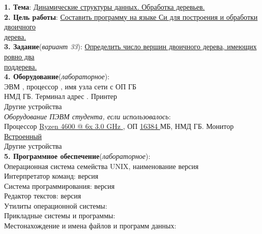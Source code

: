 \documentclass[10pt]{report}
\begin{document}
    \begin{spacing}{1}
        \indent \textbf{1. Тема}: \underline{Динамические структуры данных. Обработка деревьев.}\\               %
        \indent \textbf{2. Цель работы}: \underline{Составить программу на языке Си для построения и обработки двоичного} \\
        \indent \underline{дерева.} \\   %
        \indent \textbf{3. Задание}(\textit{вариант 33}): \underline{Определить число вершин двоичного дерева, имеющих ровно два}\\
        \indent \underline{поддерева.}\\%
        \indent \textbf{4. Оборудование}(\textit{лабораторное}):  \\ 
        \indent ЭВМ \tlinee{0.5in}, процессор \tlinee{0.7in}, имя узла сети \tlinee{0.3in} с ОП \tlinee{0.2in} ГБ\\
        \indent НМД \tlinee{0.5in} ГБ. Терминал \tlinee{0.7in} адрес \tlinee{0.7in}. Принтер \tlinee{0.7in}\\
        \indent Другие устройства \tlinee{2.5in} \\
        \indent \textit{Оборудование ПЭВМ студента, если использовалось}:  \\ 
        \indent Процессор \underline{ Ryzen 4600 @ 6x 3.0 GHz }, ОП \underline{ 16384 } МБ, НМД \tlinee{0.5in}ГБ. Монитор \underline{ Встроенный }\\
        \indent Другие устройства \tlinee{2.5in} \\

        \indent \textbf{5. Программное обеспечение}(\textit{лабораторное}):  \\ 
        \indent Операционная система семейства UNIX, наименование \underline{\hspace{0.5in}} версия \underline{\hspace{0.5in}}\\
        \indent Интерпретатор  команд: \underline{\hspace{2in}} версия \tlinee{0.5in}\\
        \indent Система программирования: \tlinee{2in} версия \tlinee{0.5in}\\
        \indent Редактор текстов: \tlinee{2in} версия \tlinee{0.5in}\\
        \indent Утилиты операционной системы: \tlinee{4in}\\
        \indent Прикладные системы и программы: \tlinee{3.7in}\\
        \indent Местонахождение и имена файлов и программ данных: \tlinee{2.2in}\\


\end{spacing}
\end{document}
